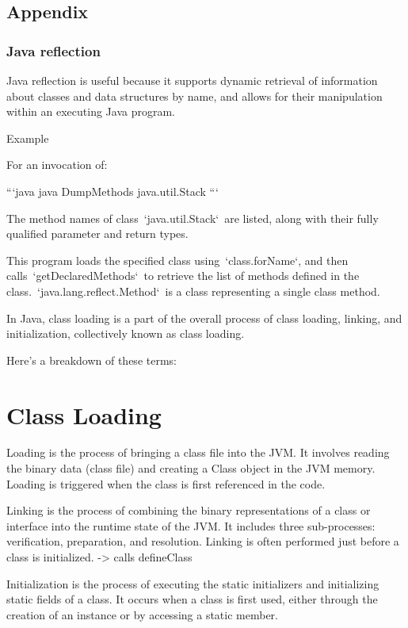 \subsection{Appendix}

\subsubsection{Java reflection}
Java reflection is useful because it supports dynamic retrieval of information about classes and data structures by name, and allows for their manipulation within an executing Java program.

Example

For an invocation of:

```java
java DumpMethods java.util.Stack
```

The method names of class `java.util.Stack` are listed, along with their fully qualified parameter and return types.

This program loads the specified class using `class.forName`, and then calls `getDeclaredMethods` to retrieve the list of methods defined in the class. `java.lang.reflect.Method` is a class representing a single class method.


In Java, class loading is a part of the overall process of class loading, linking, and initialization, collectively known as class loading.

Here's a breakdown of these terms:

\section{Class Loading}

Loading is the process of bringing a class file into the JVM.
It involves reading the binary data (class file) and creating a Class object in the JVM memory.
Loading is triggered when the class is first referenced in the code.

Linking is the process of combining the binary representations of a class or interface into the runtime state of the JVM.
It includes three sub-processes: verification, preparation, and resolution.
Linking is often performed just before a class is initialized. -> calls defineClass

Initialization is the process of executing the static initializers and initializing static fields of a class.
It occurs when a class is first used, either through the creation of an instance or by accessing a static member.


